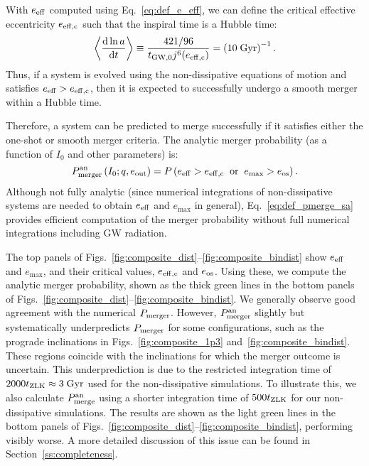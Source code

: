 \documentclass[
        fleqn,
        usenatbib,
    ]{mnras}
\newcommand*{\rd}[2]{\frac{\mathrm{d}#1}{\mathrm{d}#2}}
\newcommand*{\ev}[1]{\left\langle#1\right\rangle}
\newcommand*{\p}[1]{\left(#1\right)}
\begin{document}
With $e_{\rm eff}$ computed using Eq.~\eqref{eq:def_e_eff}, we can define the
critical effective eccentricity $e_{\rm eff, c}$ such that the inspiral time is
a Hubble time:
\begin{equation}
    \ev{\rd{\ln a}{t}} \equiv \frac{421/96}{t_{\rm GW, 0}j^6(e_{\rm eff, c})}
        = \p{10\;\mathrm{Gyr}}^{-1}. \label{eq:def_e_eff_c}
\end{equation}
Thus, if a system is evolved using the non-dissipative equations of motion and
satisfies $e_{\rm eff} > e_{\rm eff, c}$, then it is expected to successfully
undergo a smooth merger within a Hubble time.

Therefore, a system can be predicted to merge successfully if it satisfies either
the one-shot or smooth merger criteria. The analytic merger probability (as a
function of $I_0$ and other parameters) is:
\begin{equation}
    P_{\rm merger}^{\rm an}\p{I_0; q, e_{\rm out}} =
        P\p{e_{\rm eff} > e_{\rm eff, c} \;\;\text{or}\;\;
        e_{\max} > e_{\rm os}}.\label{eq:def_pmerge_sa}
\end{equation}
Although not fully analytic (since numerical integrations of non-dissipative
systems are needed to obtain $e_{\rm eff}$ and $e_{\max}$ in general),
Eq.~\eqref{eq:def_pmerge_sa} provides efficient computation of the merger
probability without full numerical integrations including GW radiation.

The top panels of Figs.~\ref{fig:composite_dist}--\ref{fig:composite_bindist}
show $e_{\rm eff}$ and $e_{\max}$, and their critical values, $e_{\rm eff, c}$
and $e_{\rm os}$. Using these, we compute the analytic merger probability, shown
as the thick green lines in the bottom panels of
Figs.~\ref{fig:composite_dist}--\ref{fig:composite_bindist}. We generally
observe good agreement with the numerical $P_{\rm merger}$. However, $P_{\rm
merger}^{\rm an}$ slightly but systematically underpredicts $P_{\rm merger}$ for
some configurations, such as the prograde inclinations in
Figs.~\ref{fig:composite_1p3} and~\ref{fig:composite_bindist}. These regions
coincide with the inclinations for which the merger outcome is uncertain. This
underprediction is due to the restricted integration time of $2000 t_{\rm ZLK}
\approx 3\;\mathrm{Gyr}$ used for the non-dissipative simulations. To illustrate
this, we also calculate $P_{\rm merge}^{\rm an}$ using a shorter integration
time of $500 t_{\rm ZLK}$ for our non-dissipative simulations. The results are
shown as the light green lines in the bottom panels of
Figs.~\ref{fig:composite_dist}--\ref{fig:composite_bindist}, performing visibly
worse. A more detailed discussion of this issue can be found in
Section~\ref{ss:completeness}.
\end{document}
